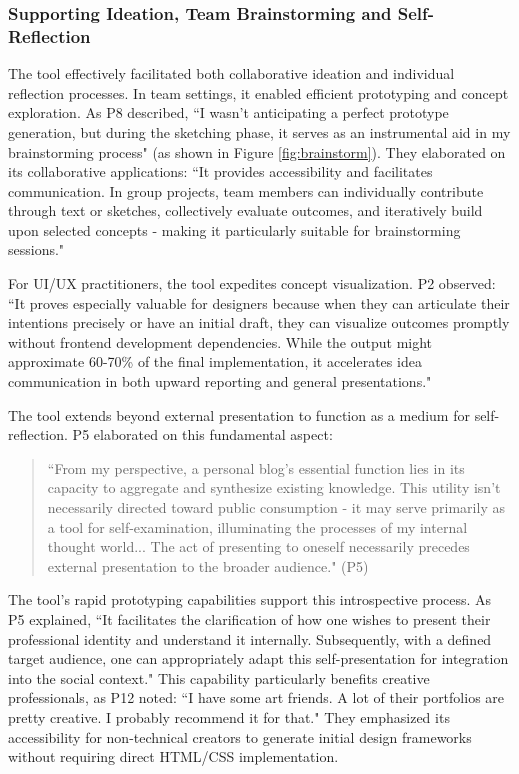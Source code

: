 \subsubsection{Supporting Ideation, Team Brainstorming and Self-Reflection}
The tool effectively facilitated both collaborative ideation and individual reflection processes. In team settings, it enabled efficient prototyping and concept exploration. As P8 described, ``I wasn't anticipating a perfect prototype generation, but during the sketching phase, it serves as an instrumental aid in my brainstorming process" (as shown in Figure \ref{fig:brainstorm}). They elaborated on its collaborative applications: ``It provides accessibility and facilitates communication. In group projects, team members can individually contribute through text or sketches, collectively evaluate outcomes, and iteratively build upon selected concepts - making it particularly suitable for brainstorming sessions."

For UI/UX practitioners, the tool expedites concept visualization. P2 observed: ``It proves especially valuable for designers because when they can articulate their intentions precisely or have an initial draft, they can visualize outcomes promptly without frontend development dependencies. While the output might approximate 60-70\% of the final implementation, it accelerates idea communication in both upward reporting and general presentations."

The tool extends beyond external presentation to function as a medium for self-reflection. P5 elaborated on this fundamental aspect:

\begin{quote}
``From my perspective, a personal blog's essential function lies in its capacity to aggregate and synthesize existing knowledge. This utility isn't necessarily directed toward public consumption - it may serve primarily as a tool for self-examination, illuminating the processes of my internal thought world... The act of presenting to oneself necessarily precedes external presentation to the broader audience." (P5)
\end{quote}

The tool's rapid prototyping capabilities support this introspective process. As P5 explained, ``It facilitates the clarification of how one wishes to present their professional identity and understand it internally. Subsequently, with a defined target audience, one can appropriately adapt this self-presentation for integration into the social context." This capability particularly benefits creative professionals, as P12 noted: ``I have some art friends. A lot of their portfolios are pretty creative. I probably recommend it for that." They emphasized its accessibility for non-technical creators to generate initial design frameworks without requiring direct HTML/CSS implementation.

